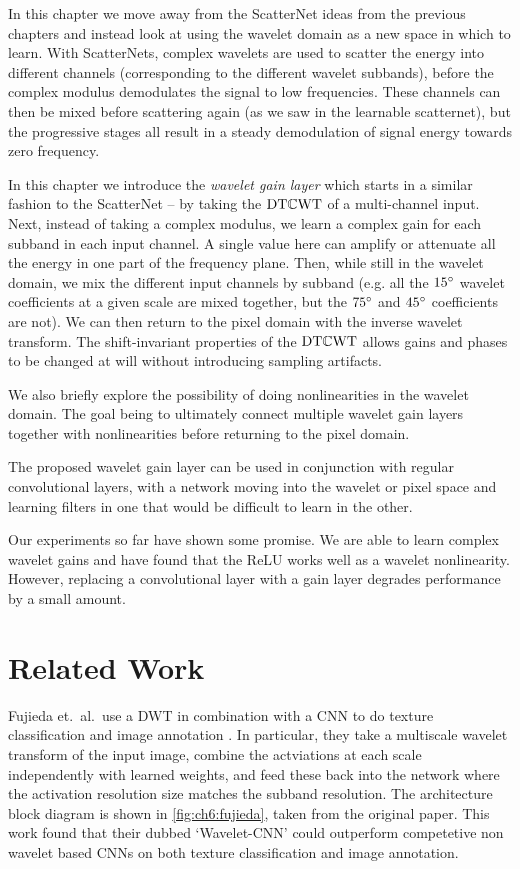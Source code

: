 In this chapter we move away from the ScatterNet ideas from the previous 
chapters and instead look at using the wavelet domain as a new space in which to
learn. With ScatterNets, complex wavelets are used to scatter the energy into
different channels (corresponding to the different wavelet subbands), before the
complex modulus demodulates the signal to low frequencies. These channels can
then be mixed before scattering again (as we saw in the learnable scatternet),
but the progressive stages all result in a steady demodulation of signal energy
towards zero frequency. 

In this chapter we introduce the \emph{wavelet gain layer}
which starts in a similar fashion to the ScatterNet -- by taking the $\mathrm{DT}\mathbb{C}\mathrm{WT}$ of
a multi-channel input. Next, instead of taking a complex modulus, we learn a 
complex gain for each subband in each input channel. A single value here can 
amplify or attenuate all the energy in one part of the frequency plane. Then, 
while still in the wavelet domain, we mix the different input channels by subband (e.g.
all the $15^{\circ}$ wavelet coefficients at a given scale are mixed together, but
the $75^{\circ}$ and $45^{\circ}$ coefficients are not). We can then return to the
pixel domain with the inverse wavelet transform. The shift-invariant properties
of the $\mathrm{DT}\mathbb{C}\mathrm{WT}$ allows gains and phases to be changed at will without
introducing sampling artifacts.

We also briefly explore the possibility of doing nonlinearities in the wavelet
domain. The goal being to ultimately connect multiple wavelet gain layers
together with nonlinearities before returning to the pixel domain. 

The proposed wavelet gain layer can be used in conjunction with regular
convolutional layers, with a network moving into the wavelet or pixel space and
learning filters in one that would be difficult to learn in the other.

Our experiments so far have shown some promise. We are able to learn complex
wavelet gains and have found that the ReLU works well as a wavelet nonlinearity.
However, replacing a convolutional layer with a gain layer degrades performance
by a small amount.


\section{Related Work}\label{sec:ch6:related} 
Fujieda et.\ al.\ use a DWT in combination with a
CNN to do texture classification and image annotation 
\cite{fujieda_wavelet_2017, fujieda_wavelet_2018}. In particular, they take a
multiscale wavelet transform of the input image, combine the actviations at each
scale independently with learned weights, and feed these back into the network
where the activation resolution size matches the subband resolution. The
architecture block diagram is shown in \autoref{fig:ch6:fujieda}, taken from the
original paper.  This work found that their dubbed `Wavelet-CNN' could
outperform competetive non wavelet based CNNs on both texture classification and
image annotation.

